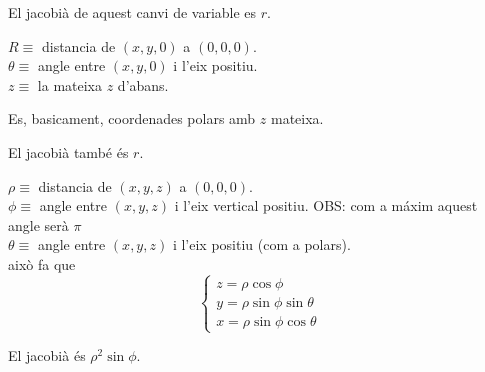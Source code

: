\documentclass[../main.tex]{subfiles}
\begin{document}
    \begin{proposicio}
        El jacobià de aquest canvi de variable es $r$.
    \end{proposicio}
    \begin{definicio}
        $\;$\\
        $R \equiv$ distancia de $(x,y,0)$ a $(0,0,0)$.\\
        $\theta \equiv$ angle entre $(x,y,0)$ i l'eix positiu.\\
        $z \equiv$ la mateixa $z$ d'abans.
        \begin{obs}
            Es, basicament, coordenades polars amb $z$ mateixa.
        \end{obs}
    \end{definicio}
    \begin{proposicio}
        El jacobià també és $r$.
    \end{proposicio}
    \begin{definicio}
        $\;$\\
        $\rho \equiv$ distancia de $(x,y,z)$ a $(0,0,0)$.\\
        $\phi \equiv$ angle entre $(x,y,z)$ i l'eix vertical positiu. OBS: com a máxim aquest angle serà $\pi$\\
        $\theta \equiv$ angle entre $(x,y,z)$ i l'eix positiu (com a polars).\\
        això fa que
        \begin{displaymath}
            \begin{cases}
                z = \rho\cos\phi\\
                y = \rho\sin\phi\sin\theta\\
                x = \rho\sin\phi\cos\theta
            \end{cases}
        \end{displaymath}
    \end{definicio}
    \begin{proposicio}
        El jacobià és $\rho^2\sin\phi$.
    \end{proposicio}
\end{document}
